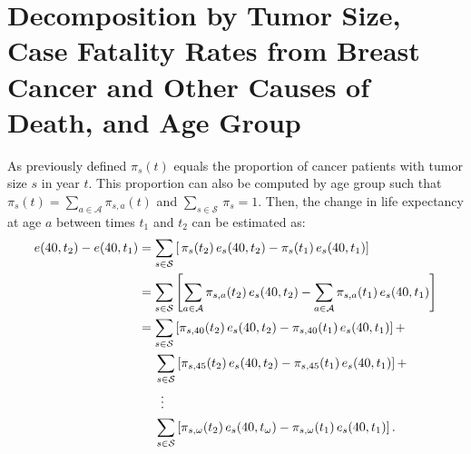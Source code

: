 \documentclass[11pt,letterpaper]{article}
\theoremstyle{plain}
\begin{document}
\section{Decomposition by Tumor Size, Case Fatality Rates from
  Breast Cancer and Other Causes of Death, and Age Group}
\label{sec:age}
As previously defined $\pi_{s}(t)$ equals the proportion of cancer patients with tumor size
$s$ in year $t$. This proportion can also be computed by age group
such that $\pi_s(t)=\sum_{a\in\mathcal{A}}\pi_{s,a}(t)$ and
$\sum_{s\in\mathcal{S}}\,\pi_s=1$.  Then, the
change in life expectancy at age $a$ between times $t_1$ and $t_2$ can
be estimated as:
\begin{align*}
  e(40,t_2)-e(40,t_1)&=\sum_{s\in\mathcal{S}}\left[\,\pi_s(t_2)\,e_s(40,t_2)- \pi_s(t_1)\,e_s(40,t_1)\right] \\
                     &=\sum_{s\in\mathcal{S}} \left[\sum_{a\in\mathcal{A}}\pi_{s,a}(t_2)\,e_s(40,t_2)- \sum_{a\in\mathcal{A}}\pi_{s,a}(t_1)\,e_s(40,t_1) \right]\\
                     &=\sum_{s\in\mathcal{S}}\left[\pi_{s,40}(t_2)\,e_s(40,t_2)-
                       \pi_{s,40}(t_1)\,e_s(40,t_1)\right] +\\
                     &\hspace{0.18in}\sum_{s\in\mathcal{S}}\left[\pi_{s,45}(t_2)\,e_s(40,t_2)- \pi_{s,45}(t_1)\,e_s(40,t_1)\right] + \\
  &\phantom{=\Sigma}\vdots \\
                     &\hspace{0.18in}\sum_{s\in\mathcal{S}}\left[\pi_{s,\omega}(t_2)\,e_s(40,t_{\omega})- \pi_{s,\omega}(t_1)\,e_s(40,t_1)\right]. \notag 
 \end{align*}
\end{document}
